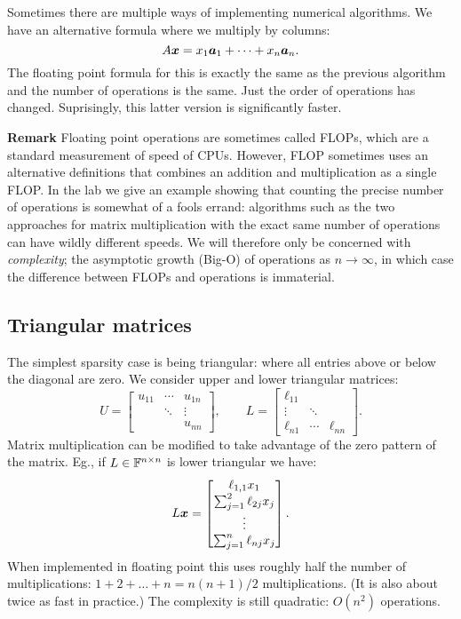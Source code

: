 Sometimes there are multiple ways of implementing numerical algorithms. We have an alternative formula where we multiply by columns:
\[
A \bm{{\mbox{\boldmath$x$\unboldmath}}} = x_1 \bm{{\mbox{\boldmath$a$\unboldmath}}}_1  + \cdots + x_n \bm{{\mbox{\boldmath$a$\unboldmath}}}_n.
\]
The floating point formula for this is exactly the same as the previous algorithm and the number of operations is the same. Just the order of operations has changed. Suprisingly, this latter version is significantly faster.

\textbf{Remark} Floating point operations are sometimes called FLOPs, which are a standard measurement  of speed of CPUs. However, FLOP sometimes uses an alternative definitions that combines an addition and multiplication as a single FLOP. In the lab we give an example showing that counting the precise number of operations is somewhat of a fools errand: algorithms such as the two approaches for matrix multiplication with the exact same number of operations can have wildly different speeds. We will therefore only be concerned with \emph{complexity}; the asymptotic growth (Big-O) of operations as $n \ensuremath{\rightarrow} \ensuremath{\infty}$, in which case the difference between FLOPs and operations is immaterial.

\subsection{Triangular matrices}
The simplest sparsity case is being triangular: where all entries above or below the diagonal are zero. We consider upper and lower triangular matrices:
\[
U = \begin{bmatrix}
u_{11} & \ensuremath{\cdots} & u_{1n} \\
 & \ensuremath{\ddots} & \ensuremath{\vdots} \\
 &  & u_{nn}
\end{bmatrix}, \qquad L = \begin{bmatrix}
\ensuremath{\ell}_{11} &  \\
\ensuremath{\vdots} & \ensuremath{\ddots} & \\
\ensuremath{\ell}_{n1} & \ensuremath{\cdots} & \ensuremath{\ell}_{nn}
\end{bmatrix}.
\]
Matrix multiplication can be modified to take advantage of the zero pattern of the matrix. Eg., if $L \in {\mathbb F}^{n \times n}$ is lower triangular we have:
\[
L\bm{{\mbox{\boldmath$x$\unboldmath}}} = \begin{bmatrix} \ell_{1,1} x_1 \\ \sum_{j=1}^2 \ell_{2j} x_j  \\ \vdots \\ \sum_{j=1}^n \ell_{nj} x_j \end{bmatrix}.
\]
When implemented in floating point this uses roughly half the number of multiplications: $1 + 2 + \ensuremath{\ldots} + n = n(n+1)/2$ multiplications. (It is also about twice as fast in practice.) The complexity is still quadratic: $O(n^2)$ operations.

